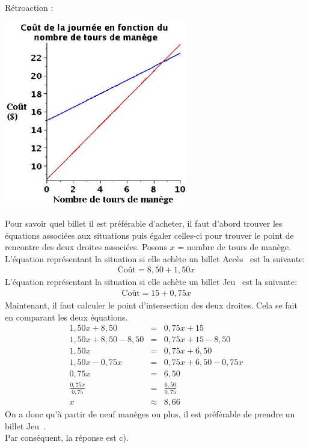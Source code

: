 \documentclass[letterpaper, 12pt]{article}
\begin{document}
R\'etroaction :\\
\begin{center}
 \includegraphics[width=8cm,bb=14 14 415 415]{Q2101.eps}
\end{center}
Pour savoir quel billet il est pr\'ef\'erable d'acheter, il faut d'abord trouver les \'equations associ\'ees aux situations puis \'egaler celles-ci pour trouver le point de rencontre des deux droites associ\'ees. Posons $x$ = nombre de tours de man\`ege.\\
L'\'equation repr\'esentant la situation si elle ach\`ete un billet \og Acc\`es \fg\, est la suivante:
\begin{eqnarray*}
 \textrm{Co\^ut} = 8,50 + 1,50x
\end{eqnarray*}
L'\'equation repr\'esentant la situation si elle ach\`ete un billet \og Jeu \fg\, est la suivante:
\begin{eqnarray*}
 \textrm{Co\^ut} = 15 + 0,75x
\end{eqnarray*}
Maintenant, il faut calculer le point d'intersection des deux droites. Cela se fait en comparant les deux \'equations.
\begin{eqnarray*}
 1,50x + 8,50 &=& 0,75x + 15 \\
 1,50x + 8,50 - 8,50 &=& 0,75x + 15 - 8,50 \\
 1,50x &=& 0,75x + 6,50 \\
 1,50x - 0,75x &=& 0,75x + 6,50 - 0,75x \\
 0,75x &=& 6,50\\[2mm]
\frac{0,75x}{0,75} &=& \frac{6,50}{0,75}\\[2mm]
x &\approx& 8,66
\end{eqnarray*}
On a donc qu'\`a partir de neuf man\`eges ou plus, il est pr\'ef\'erable de prendre un billet \og Jeu \fg\,.\\
Par cons\'equent, la r\'eponse est c).\\
\end{document}
